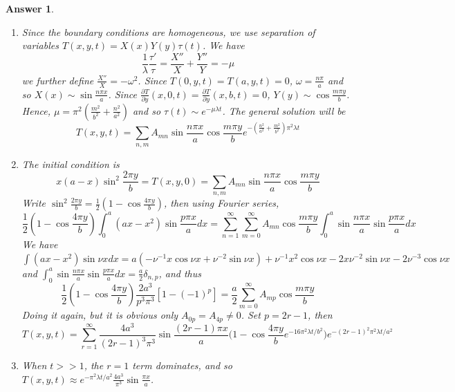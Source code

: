 \documentclass[a4paper]{article}
\newtheorem{ans}{Answer}[section]
\theoremstyle{new}
\begin{document}
\begin{ans}\leavevmode
\begin{enumerate}[label=(\alph*)]
\item  Since the boundary conditions are homogeneous, we use separation of variables $T(x,y,t)=X(x)Y(y)\tau(t)$. We have
$$\frac{1}{\lambda}\frac{\tau'}{\tau}=\frac{X''}{X}+\frac{Y''}{Y}=-\mu$$
we further define $\frac{X''}{X}=-\omega^2$. Since $T(0,y,t)=T(a,y,t)=0$, $\omega=\frac{n\pi}{a}$ and so $X(x)\sim\sin\frac{n\pi x}{a}$. Since $\frac{\partial T}{\partial y}(x,0,t)=\frac{\partial T}{\partial y}(x,b,t)=0$, $Y(y)\sim\cos\frac{m\pi y}{b}$. Hence, $\mu=\pi^2(\frac{m^2}{b^2}+\frac{n^2}{a^2})$ and so $\tau(t)\sim e^{-\mu\lambda t}$. The general solution will be
$$T(x,y,t)=\sum_{n,m}A_{mn}\sin\frac{n\pi x}{a}\cos\frac{m\pi y}{b}e^{-(\frac{n^2}{a^2}+\frac{m^2}{b^2})\pi^2\lambda t}$$
\item The initial condition is
$$x(a-x)\sin^2\frac{2\pi y}{b}=T(x,y,0)=\sum_{n,m}A_{mn}\sin\frac{n\pi x}{a}\cos\frac{m\pi y}{b}$$
Write $\sin^2\frac{2\pi y}{b}=\frac{1}{2}(1-\cos\frac{4\pi y}{b})$, then using Fourier series,
$$\frac{1}{2}(1-\cos\frac{4\pi y}{b})\int_0^a(ax-x^2)\sin\frac{p\pi x}{a}dx=\sum_{n=1}^\infty\sum_{m=0}^\infty A_{mn}\cos\frac{m\pi y}{b}\int_0^a\sin\frac{n\pi x}{a}\sin\frac{p\pi x}{a}dx$$
We have $\int(ax-x^2)\sin\nu xdx=a(-\nu^{-1}x\cos\nu x+\nu^{-2}\sin\nu x)+\nu^{-1}x^2\cos\nu x-2x\nu^{-2}\sin\nu x-2\nu^{-3}\cos\nu x$ and $\int_0^a\sin\frac{n\pi x}{a}\sin\frac{p\pi x}{a}dx=\frac{a}{2}\delta_{n,p}$, and thus
$$\frac{1}{2}(1-\cos\frac{4\pi y}{b})\frac{2a^3}{p^3\pi^3}[1-(-1)^p]=\frac{a}{2}\sum_{m=0}^\infty A_{mp}\cos\frac{m\pi y}{b}$$
Doing it again, but it is obvious only $A_{0p}=A_{4p}\neq 0$. Set $p=2r-1$, then
$$T(x,y,t)=\sum_{r=1}^\infty\frac{4a^3}{(2r-1)^3\pi^3}\sin\frac{(2r-1)\pi x}{a}\bigg(1-\cos\frac{4\pi y}{b}e^{-16\pi^2\lambda t/b^2}\bigg)e^{-(2r-1)^2\pi^2\lambda t/a^2}$$
\item When $t>>1$, the $r=1$ term dominates, and so $T(x,y,t)\approx e^{-\pi^2\lambda t/a^2}\frac{4a^3}{\pi^3}\sin\frac{\pi x}{a}$.
\end{enumerate}
\end{ans}
\newpage
\end{document}
